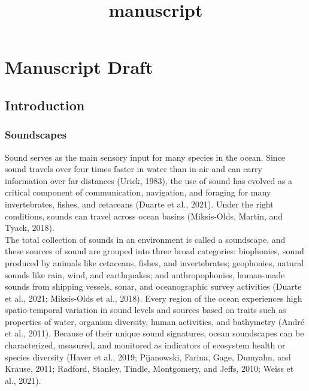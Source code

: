\documentclass[
]{article}
\title{manuscript}
\author{}
\date{\vspace{-2.5em}}
\begin{document}
\maketitle

\hypertarget{manuscript-draft}{%
\section{Manuscript Draft}\label{manuscript-draft}}

\hypertarget{introduction}{%
\subsection{Introduction}\label{introduction}}

\hypertarget{soundscapes}{%
\subsubsection{Soundscapes}\label{soundscapes}}

Sound serves as the main sensory input for many species in the ocean.
Since sound travels over four times faster in water than in air and can
carry information over far distances (Urick, 1983), the use of sound has
evolved as a critical component of communication, navigation, and
foraging for many invertebrates, fishes, and cetaceans (Duarte et al.,
2021). Under the right conditions, sounds can travel across ocean basins
(Miksis-Olds, Martin, and Tyack, 2018).\\

The total collection of sounds in an environment is called a soundscape,
and these sources of sound are grouped into three broad categories:
biophonies, sound produced by animals like cetaceans, fishes, and
invertebrates; geophonies, natural sounds like rain, wind, and
earthquakes; and anthropophonies, human-made sounds from shipping
vessels, sonar, and oceanographic survey activities (Duarte et al.,
2021; Miksis-Olds et al., 2018). Every region of the ocean experiences
high spatio-temporal variation in sound levels and sources based on
traits such as properties of water, organism diversity, human
activities, and bathymetry (André et al., 2011). Because of their unique
sound signatures, ocean soundscapes can be characterized, measured, and
monitored as indicators of ecosystem health or species diversity (Haver
et al., 2019; Pijanowski, Farina, Gage, Dumyahn, and Krause, 2011;
Radford, Stanley, Tindle, Montgomery, and Jeffs, 2010; Weiss et al.,
2021).\\
\end{document}
